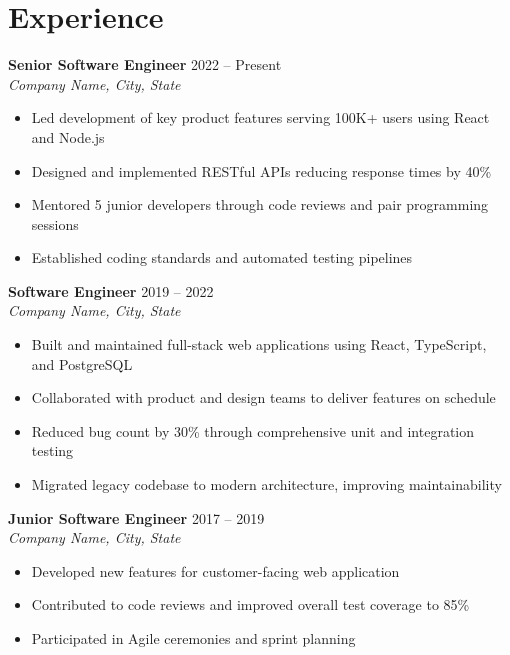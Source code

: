 \documentclass[10pt,A4]{article}
\begin{document}
\section*{Experience}

\textbf{Senior Software Engineer} \hfill 2022 -- Present\\
\textit{Company Name, City, State}
\begin{itemize}
	\item Led development of key product features serving 100K+ users using React and Node.js
	\item Designed and implemented RESTful APIs reducing response times by 40\%
	\item Mentored 5 junior developers through code reviews and pair programming sessions
	\item Established coding standards and automated testing pipelines
\end{itemize}

\textbf{Software Engineer} \hfill 2019 -- 2022\\
\textit{Company Name, City, State}
\begin{itemize}
	\item Built and maintained full-stack web applications using React, TypeScript, and PostgreSQL
	\item Collaborated with product and design teams to deliver features on schedule
	\item Reduced bug count by 30\% through comprehensive unit and integration testing
	\item Migrated legacy codebase to modern architecture, improving maintainability
\end{itemize}

\textbf{Junior Software Engineer} \hfill 2017 -- 2019\\
\textit{Company Name, City, State}
\begin{itemize}
	\item Developed new features for customer-facing web application
	\item Contributed to code reviews and improved overall test coverage to 85\%
	\item Participated in Agile ceremonies and sprint planning
\end{itemize}

\end{document}
